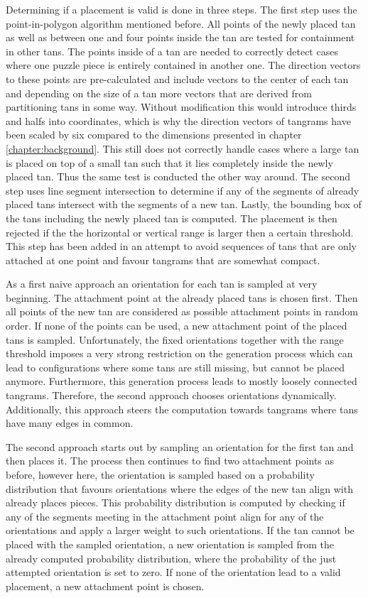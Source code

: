 Determining if a placement is valid is done in three steps. The first step uses the point-in-polygon algorithm mentioned before. All points of the newly placed tan as well as between one and four points inside the tan are tested for containment in other tans. The points inside of a tan are needed to correctly detect cases where one puzzle piece is entirely contained in another one. The direction vectors to these points are pre-calculated and include vectors to the center of each tan and depending on the size of a tan more vectors that are derived from partitioning tans in some way. Without modification this would introduce thirds and halfs into coordinates, which is why the direction vectors of tangrams have been scaled by six compared to the dimensions presented in chapter \ref{chapter:background}. This still does not correctly handle cases where a large tan is placed on top of a small tan such that it lies completely inside the newly placed tan. Thus the same test is conducted the other way around. The second step uses line segment intersection to determine if any of the segments of already placed tans intersect with the segments of a new tan.
Lastly, the bounding box of the tans including the newly placed tan is computed. The placement is then rejected if the the horizontal or vertical range is larger then a certain threshold. This step has been added in an attempt to avoid  sequences of tans that are only attached at one point and favour tangrams that are somewhat compact.

As a first naive approach an orientation for each tan is sampled at very beginning. The attachment point at the already placed tans is chosen first. Then all points of the new tan are considered as possible attachment points in random order. If none of the points can be used, a new attachment point of the placed tans is sampled. Unfortunately, the fixed orientations together with the range threshold imposes a very strong restriction on the generation process which can lead to configurations where some tans are still missing, but cannot be placed anymore. Furthermore, this generation process leads to mostly loosely connected tangrams. Therefore, the second approach chooses orientations dynamically. Additionally, this approach steers the computation towards tangrams where tans have many edges in common.

The second approach starts out by sampling an orientation for the first tan and then places it. The process then continues to find two attachment points as before, however here, the orientation is sampled based on a probability distribution that favours orientations where the edges of the new tan align with already places pieces. This probability distribution is computed by checking if any of the segments meeting in the attachment point align for any of the orientations and apply a larger weight to such orientations. If the tan cannot be placed with the sampled orientation, a new orientation is sampled from the already computed probability distribution, where the probability of the just attempted orientation is set to zero. If none of the orientation lead to a valid placement, a new attachment point is chosen.

